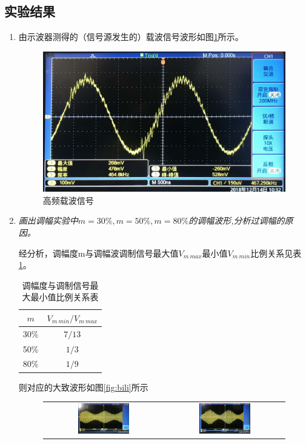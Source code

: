 \documentclass[12pt]{article}%
\numberwithin{equation}{section}
\begin{document}
\subsection{实验结果}
\begin{enumerate}\addtolength{\itemsep}{-1.5ex}
\item 由示波器测得的（信号源发生的）载波信号波形如图\ref{img:zbAM}所示。
 \begin{figure}[htbp]
  \centering
  \includegraphics[width=.5\textwidth]{gaopin5/gaopin506.jpg} 
  \caption{高频载波信号 } 
  \label{img:zbAM} 
\end{figure}
\item \emph{画出调幅实验中$m=30\%,m=50\%,m = 80\% $的调幅波形,分析过调幅的原因。}\par
经分析，调幅度m与调幅波调制信号最大值$V_{m\ max}$最小值$V_{m\ min}$比例关系见表\ref{tab:bili}。
\begin{table}[htbp]
\centering
\caption{调幅度与调制信号最大最小值比例关系表}
\label{tab:bili}
\begin{tabular}{|c|c|}
\hline
$m  $  & ${V_{m\    min}}/{V_{m\  max}}$ \\\hline
30\% & ${7}/{13}$                                                                \\\hline
50\% &$ {1}/{3}            $                                                     \\\hline
80\% & ${1}/{9}          $          \\\hline
\end{tabular}
\end{table}\par\par 则对应的大致波形如图\ref{fig:bili}所示
\begin{figure}[htbp]
\centering
\begin{tabular}{cc}
\includegraphics[width=0.45\textwidth]{gaopin5/gaopin502.jpg}&\includegraphics[width=0.45\textwidth]{gaopin5/gaopin504.jpg}\\

\end{tabular}
\end{figure}
\end{enumerate}
\end{document}
